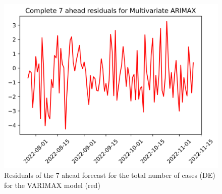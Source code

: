 \begin{figure}
\begin{minipage}{.32\textwidth}
  \label{fig:tot_cases_error_7_flasso_DE}
\end{minipage}
\begin{minipage}{.32\textwidth}
  \centering
  \includegraphics[width=\linewidth]{pics/7_ah/DE_7_ahead_errors_Multivariate ARIMAX.png}
  \caption{Residuals of the 7 ahead forecast for the total number of cases (DE) for the VARIMAX model (red)}
  \label{fig:tot_cases_error_7_VARIMAX_DE}
\end{minipage}
\end{figure}
